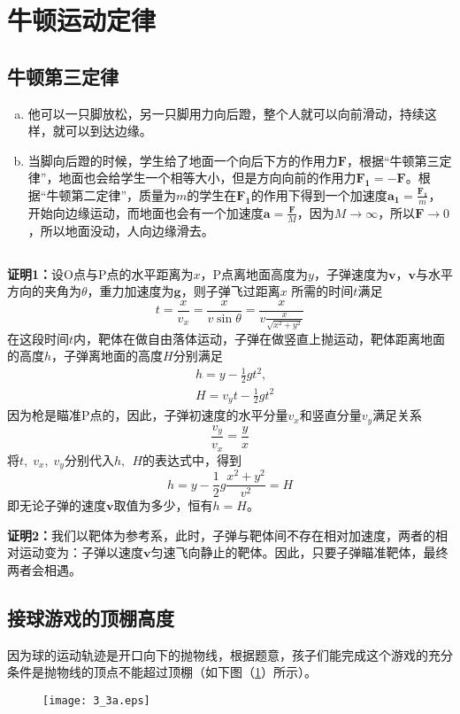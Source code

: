 
\section{牛顿运动定律}

\subsection{牛顿第三定律}
\begin{enumerate}[(a)]
	\item
	他可以一只脚放松，另一只脚用力向后蹬，整个人就可以向前滑动，持续这样，就可以到达边缘。
	\item
	当脚向后蹬的时候，学生给了地面一个向后下方的作用力$\bm{F}$，根据“牛顿第三定律”，地面也会给学生一个相等大小，但是方向向前的作用力$\bm{F_1} = -\bm{F}$。根据“牛顿第二定律”，质量为$m$的学生在$\bm{F_1}$的作用下得到一个加速度$\bm{a_1} = \frac{\bm{F_1}}{m}$，开始向边缘运动，而地面也会有一个加速度$\bm{a} = \frac{\bm{F}}{M}$，因为$M \to \infty$，所以$\bm{F} \to 0$，所以地面没动，人向边缘滑去。
\end{enumerate}
\subsection{}
\label{subsec_3.2}
{\bfseries 证明1：}设O点与P点的水平距离为$x$，P点离地面高度为$y$，子弹速度为$\bm{v}$，$\bm{v}$与水平方向的夹角为$\theta$，重力加速度为$\bm{g}$，则子弹飞过距离$x$ 所需的时间$t$满足
\[
t = \frac{x}{v_x} = \frac{x}{v\sin\theta} = \frac{x}{v \frac{x}{\sqrt{x^2+y^2}}}
\]
在这段时间$t$内，靶体在做自由落体运动，子弹在做竖直上抛运动，靶体距离地面的高度$h$，子弹离地面的高度$H$分别满足
\[
\begin{aligned}
& h = y-\frac{1}{2}gt^2, \\
& H = v_yt - \frac{1}{2}gt^2
\end{aligned}
\]
因为枪是瞄准P点的，因此，子弹初速度的水平分量$v_x$和竖直分量$v_y$满足关系
\[
\frac{v_y}{v_x} = \frac{y}{x}
\]
将$t,\;v_x,\;v_y$分别代入$h,\,\;H$的表达式中，得到
\[
h = y-\frac{1}{2}g \frac{x^2+y^2}{v^2} = H
\]
即无论子弹的速度$\bm{v}$取值为多少，恒有$h = H$。

{\bfseries 证明2：}我们以靶体为参考系，此时，子弹与靶体间不存在相对加速度，两者的相对运动变为：子弹以速度$\bm{v}$匀速飞向静止的靶体。因此，只要子弹瞄准靶体，最终两者会相遇。
\subsection{接球游戏的顶棚高度}
因为球的运动轨迹是开口向下的抛物线，根据题意，孩子们能完成这个游戏的充分条件是抛物线的顶点不能超过顶棚（如下图（\ref{3_3a}）所示）。
\begin{figure}[htbp]
	\centering
	\texttt{[image: 3\_3a.eps]}
	\caption{}
	\label{3_3a}
\end{figure}


